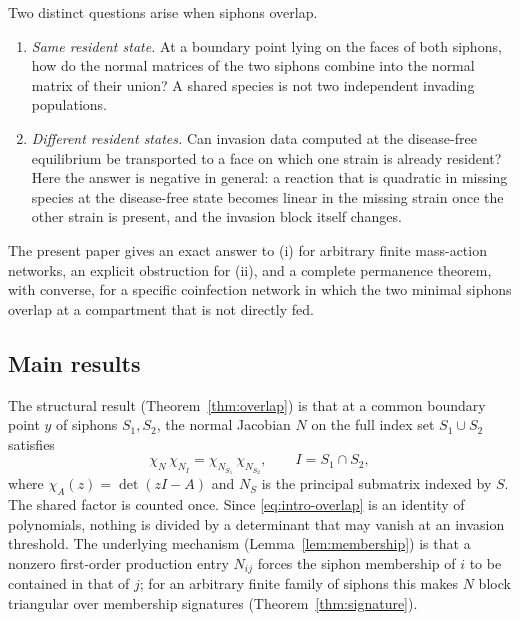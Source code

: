 \documentclass[11pt,a4paper]{article}
\theoremstyle{plain}
\theoremstyle{definition}
\theoremstyle{remark}
\newcommand{\ch}{\chi}
\begin{document}
Two distinct questions arise when siphons overlap.
\begin{enumerate}[label=(\roman*)]
\item \emph{Same resident state.} At a boundary point lying on the faces of both siphons, how do the normal matrices of the two siphons combine into the normal matrix of their union? A shared species is not two independent invading populations.
\item \emph{Different resident states.} Can invasion data computed at the disease-free equilibrium be transported to a face on which one strain is already resident? Here the answer is negative in general: a reaction that is quadratic in missing species at the disease-free state becomes linear in the missing strain once the other strain is present, and the invasion block itself changes.
\end{enumerate}
The present paper gives an exact answer to (i) for arbitrary finite mass-action networks, an explicit obstruction for (ii), and a complete permanence theorem, with converse, for a specific coinfection network in which the two minimal siphons overlap at a compartment that is not directly fed.

\subsection{Main results}

The structural result (Theorem~\ref{thm:overlap}) is that at a common boundary point $y$ of siphons $S_1,S_2$, the normal Jacobian $N$ on the full index set $S_1\cup S_2$ satisfies
\begin{equation}\label{eq:intro-overlap}
 \ch_N\,\ch_{N_I}=\ch_{N_{S_1}}\,\ch_{N_{S_2}},\qquad I=S_1\cap S_2,
\end{equation}
where $\ch_A(z)=\det(zI-A)$ and $N_S$ is the principal submatrix indexed by $S$. The shared factor is counted once. Since \eqref{eq:intro-overlap} is an identity of polynomials, nothing is divided by a determinant that may vanish at an invasion threshold. The underlying mechanism (Lemma~\ref{lem:membership}) is that a nonzero first-order production entry $N_{ij}$ forces the siphon membership of $i$ to be contained in that of $j$; for an arbitrary finite family of siphons this makes $N$ block triangular over membership signatures (Theorem~\ref{thm:signature}).
\end{document}
